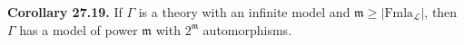 \textbf{Corollary 27.19.}
If $\Gamma$ is a theory with an infinite model and $\mathfrak{m} \geq |\mathrm{Fmla}_{\mathcal{L}}|$, then $\Gamma$ has a model of power $\mathfrak{m}$ with $2^{\mathfrak{m}}$ automorphisms.
